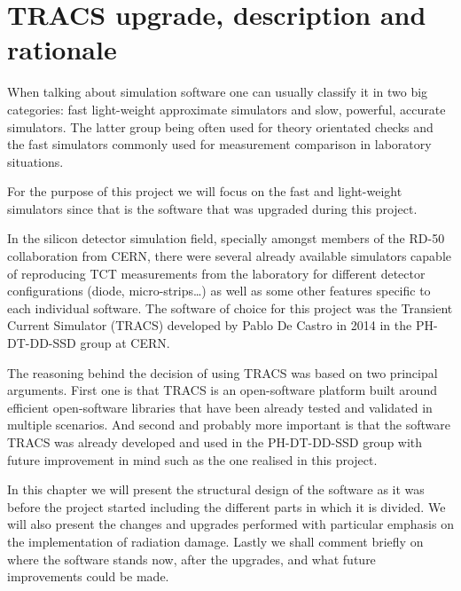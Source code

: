 \chapter{TRACS upgrade, description and rationale}
\label{chap:tracs}

When talking about simulation software one can usually classify it in two big categories: fast light-weight approximate simulators and slow, powerful, accurate simulators. The latter group being often used for theory orientated checks and the fast simulators commonly used for measurement comparison in laboratory situations.

For the purpose of this project we will focus on the fast and light-weight simulators since that is the software that was upgraded during this project. 

In the silicon detector simulation field, specially amongst members of the RD-50 collaboration from CERN, there were several already available simulators capable of reproducing TCT measurements from the laboratory for different detector configurations (diode, micro-strips\ldots) as well as some other features specific to each individual software. The software of choice for this project was the Transient Current Simulator (TRACS) developed by Pablo De Castro in 2014 in the PH-DT-DD-SSD group at CERN. 

The reasoning behind the decision of using TRACS was based on two principal arguments. First one is that TRACS is an open-software platform built around efficient open-software libraries that have been already tested and validated in multiple scenarios. And second and probably more important is that the software TRACS was already developed and used in the PH-DT-DD-SSD group with future improvement in mind such as the one realised in this project.

In this chapter we will present the structural design of the software as it was before the project started including the different parts in which it is divided. We will also present the changes and upgrades performed with particular emphasis on the implementation of radiation damage. Lastly we shall comment briefly on where the software stands now, after the upgrades, and what future improvements could be made.

